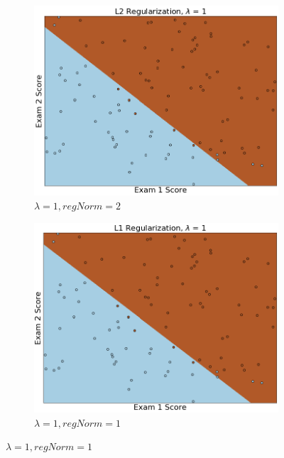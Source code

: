 \documentclass{article}
\begin{document}
\begin{enumerate}
    	\begin{figure}[h!]
     	\centering
     	\begin{subfigure}[b]{0.44\textwidth}
         	\centering
         	\includegraphics[width=\textwidth]
         	{Problem_1_3/fig_L2_4.png}
         	\caption{$\lambda = 1, regNorm = 2$}
         	\label{fig:L2_4}
     	\end{subfigure}
     	\hfill
     	\begin{subfigure}[b]{0.44\textwidth}
         	\centering
         	\includegraphics[width=\textwidth]
         	{Problem_1_3/fig_L1_4.png}
         	\caption{$\lambda = 1, regNorm = 1$}
         	\label{fig:L1_4}
     	\end{subfigure}
		\end{figure}
		

\end{enumerate}
\end{document}
